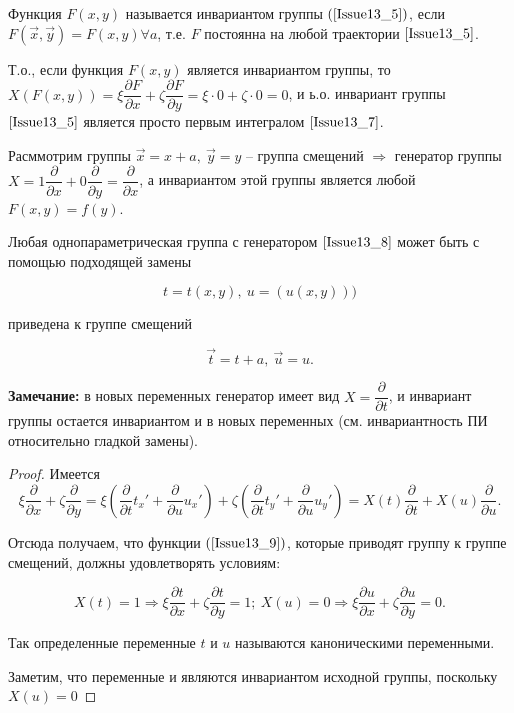Функция $F(x,y)$ называется инвариантом группы $(\ref{Issue13_5})$, если $F(\vec{x}, \vec{y}) = F(x,y) \forall a$, т.е. $F$ постоянна на любой траектории $\ref{Issue13_5}$.

Т.о., если функция $F(x,y)$ является инвариантом группы, то $X(F(x,y)) = \xi \dfrac{\partial F}{\partial x} + \zeta \dfrac{\partial F}{\partial y} = \xi \cdot 0 + \zeta \cdot 0 = 0$, и ь.о. инвариант группы $\ref{Issue13_5}$ является просто первым интегралом $\ref{Issue13_7}$.

Расммотрим группы $\vec{x} = x + a,\ \vec{y} = y$ -- группа смещений $\Rightarrow$ генератор группы $X = 1 \dfrac{\partial}{\partial x} + 0 \dfrac{\partial}{\partial y} = \dfrac{\partial}{\partial x}$, а инвариантом этой группы является любой $F(x,y) = f(y)$.

\begin{theorem}
Любая однопараметрическая группа с генератором $\ref{Issue13_8}$ может быть с помощью подходящей замены 

\begin{equation}
	t = t(x,y),\ u = (u(x,y)))
	\label{Issue13_9}
\end{equation}

приведена к группе смещений 

\begin{equation}
	\vec{t} = t + a,\ \vec{u} = u.
	\label{Issue13_10}
\end{equation}

\textbf{Замечание:} в новых переменных генератор имеет вид $X = \dfrac{\partial}{\partial t}$, и инвариант группы остается инвариантом и в новых переменных (см. инвариантность ПИ относительно гладкой замены).

\begin{proof}

Имеется \[\xi \dfrac{\partial}{\partial x} + \zeta \dfrac{\partial}{\partial y} = \xi(\dfrac{\partial}{\partial t}t_x' + \dfrac{\partial}{\partial u}u_x') + \zeta(\dfrac{\partial}{\partial t}t_y' + \dfrac{\partial}{\partial u}u_y') = X(t)\dfrac{\partial}{\partial t} + X(u)\dfrac{\partial}{\partial u}.\]

Отсюда получаем, что функции $(\ref{Issue13_9})$, которые приводят группу к группе смещений, должны удовлетворять условиям:

\begin{equation}
	X(t) = 1 \Rightarrow \xi \dfrac{\partial t}{\partial x} + \zeta \dfrac{\partial t}{\partial y} = 1;\ X(u) = 0 \Rightarrow \xi \dfrac{\partial u}{\partial x} + \zeta \dfrac{\partial u}{\partial y} = 0.
	\label{Issue13_11}
\end{equation}

Так определенные переменные $t$ и $u$ называются $\textbf{каноническими переменными}$.

Заметим, что переменные и являются инвариантом исходной группы, поскольку $X(u) = 0$

\end{proof}
\end{theorem} 



